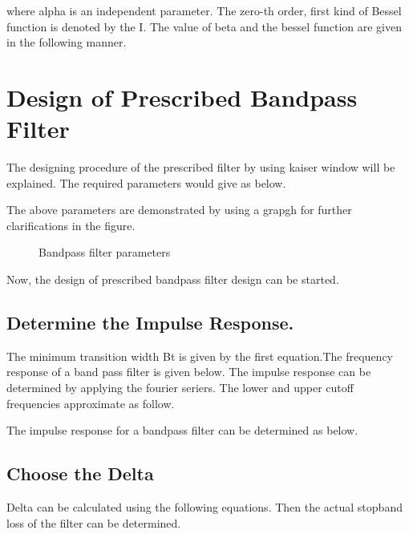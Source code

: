 \documentclass[twoside,12pt,times,onecolumn,a4paper]{report}
\begin{document}

where alpha is an independent parameter. The zero-th order, first kind of  Bessel function is denoted by the I. The value of beta and the bessel function are given in the following manner.


\section{Design of Prescribed Bandpass Filter}

\hspace{4em}The designing procedure of the prescribed filter by using kaiser window will be explained. The required parameters would give as below.


The above parameters are demonstrated by using a grapgh for further clarifications in the figure. 
 
\begin{figure}[!h]
  \centering
  \caption{Bandpass filter parameters}
\end{figure}



Now, the design of prescribed bandpass filter design can be started.

\subsection{Determine the Impulse Response.}

\hspace{4em}The minimum transition width Bt is given by the first equation.The frequency response of a band pass filter is given below. The impulse response can be determined by applying the fourier seriers. The lower and upper cutoff frequencies approximate as follow.


The impulse response for a bandpass filter can be determined as below.



\subsection{Choose the Delta}

\hspace{4em}Delta can be calculated using the following equations. Then the actual stopband loss of the filter can be determined.
\end{document}
